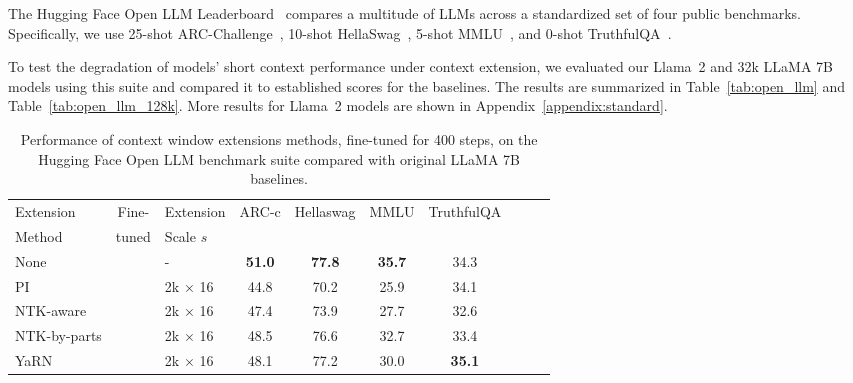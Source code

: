 \documentclass{article} %
\newcommand{\cmark}{\textcolor{green!80!black}{\ding{51}}}
\newcommand{\xmark}{\textcolor{red}{\ding{55}}}
\begin{document}
The Hugging Face Open LLM Leaderboard~\citep{openllm} compares a multitude of LLMs across a standardized set of four public benchmarks.
Specifically, we use 25-shot ARC-Challenge~\citep{clark2018think}, 10-shot HellaSwag~\citep{zellers2019hellaswag}, 5-shot MMLU~\citep{hendryckstest2021}, and 0-shot TruthfulQA~\citep{lin-etal-2022-truthfulqa}.

To test the degradation of models' short context performance under context extension, we evaluated our Llama~2 and 32k LLaMA 7B models using this suite and compared it to established scores for the baselines.
The results are summarized in Table~\ref{tab:open_llm} and Table~\ref{tab:open_llm_128k}. More results for Llama~2 models are shown in Appendix~\ref{appendix:standard}.

\begin{table}[h]
    \centering
    \begin{tabular}{lclccccccc}
       \toprule
       Extension & Fine- & Extension & \multirow{2}{*}{ARC-c} & \multirow{2}{*}{Hellaswag} & \multirow{2}{*}{MMLU} & \multirow{2}{*}{TruthfulQA}  \\
       Method    & tuned & Scale $s$\\
       \midrule
        None          & \xmark &  -   & \textbf{51.0} & \textbf{77.8} & \textbf{35.7} & 34.3 \\
        PI            & \cmark & 2k $\times$ 16 & 44.8 & 70.2 & 25.9 & 34.1 \\
        NTK-aware     & \cmark & 2k $\times$ 16 & 47.4 & 73.9 & 27.7 & 32.6 \\
        NTK-by-parts  & \cmark & 2k $\times$ 16 & 48.5 & 76.6 & 32.7 & 33.4 \\
        YaRN          & \cmark & 2k $\times$ 16 & 48.1 & 77.2 & 30.0 & \textbf{35.1} \\
       \bottomrule
    \end{tabular}
    \caption{\small Performance of context window extensions methods, fine-tuned for 400 steps, on the Hugging Face Open LLM benchmark suite compared with original LLaMA 7B baselines.}
    \label{tab:open_llm_32k}
\end{table}
\end{document}
